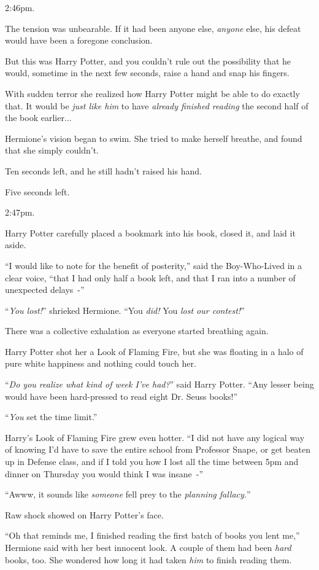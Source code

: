 2:46pm.

The tension was unbearable. If it had been anyone else, \emph{anyone} else, his defeat would have been a foregone conclusion.

But this was Harry Potter, and you couldn't rule out the possibility that he would, sometime in the next few seconds, raise a hand and snap his fingers.

With sudden terror she realized how Harry Potter might be able to do exactly that. It would be \emph{just like him} to have \emph{already finished reading} the second half of the book earlier...

Hermione's vision began to swim. She tried to make herself breathe, and found that she simply couldn't.

Ten seconds left, and he still hadn't raised his hand.

Five seconds left.

2:47pm.

Harry Potter carefully placed a bookmark into his book, closed it, and laid it aside.

``I would like to note for the benefit of posterity,'' said the Boy-Who-Lived in a clear voice, ``that I had only half a book left, and that I ran into a number of unexpected delays~-''

``\emph{You lost!}'' shrieked Hermione. ``You \emph{did!} You \emph{lost our contest!}''

There was a collective exhalation as everyone started breathing again.

Harry Potter shot her a Look of Flaming Fire, but she was floating in a halo of pure white happiness and nothing could touch her.

``\emph{Do you realize what kind of week I've had?}'' said Harry Potter. ``Any lesser being would have been hard-pressed to read eight Dr. Seuss books!''

``\emph{You} set the time limit.''

Harry's Look of Flaming Fire grew even hotter. ``I did not have any logical way of knowing I'd have to save the entire school from Professor Snape, or get beaten up in Defense class, and if I told you how I lost all the time between 5pm and dinner on Thursday you would think I was insane~-''

``Awww, it sounds like \emph{someone} fell prey to the \emph{planning fallacy.}''

Raw shock showed on Harry Potter's face.

``Oh that reminds me, I finished reading the first batch of books you lent me,'' Hermione said with her best innocent look. A couple of them had been \emph{hard} books, too. She wondered how long it had taken \emph{him} to finish reading them.

